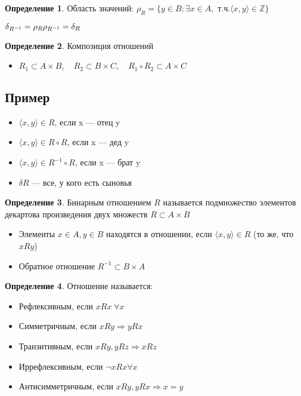 \documentclass[12pt,letterpaper]{report}
\theoremstyle{definition}
\newtheorem*{conj}{Определение}
\begin{document}
\begin{conj} 
    Область значений: 
    $\rho_{R} = \{y \in B: \exists x \in A, $ т.ч.$ \langle x, y \rangle  \in \mathbb{Z} \} $ 
\end{conj}
$\delta_{R^{-1}} = \rho_{R} \\
\rho_{R^{-1}} = \delta_{R}$

\begin{conj} 
    Композиция отношений 
\end{conj}

\begin{itemize}
    \item[] $R_1 \subset A \times B, \quad R_2 \subset B \times C, \quad R_1 \circ R_2 \subset A \times C$
\end{itemize}
\subsection*{Пример}
\begin{itemize}
    \item $\langle x, y \rangle \in R$, если x — отец y
    \item $\langle x, y \rangle \in R \circ R$, если x — дед y
    \item $\langle x, y \rangle \in R^{-1} \circ R$, если x — брат y
    \item $\delta R$ — все, у кого есть сыновья
\end{itemize}
\begin{conj} 
    Бинарным отношением $R$ называется подмножество элементов декартова произведения двух
    множеств $R \subset A \times B$
\end{conj}

\begin{itemize}
    \item[] Элементы $x \in A, y \in B$ находятся в отношении, если $  \langle x, y \rangle \in R $ (то же, что $xRy$)
    \item[] Обратное отношение $R^{-1} \subset B \times A$ 
\end{itemize}

\begin{conj}
    Отношение называется:
\end{conj}
\begin{itemize}
    \item Рефлексивным, если $xRx \; \forall x$
    \item Симметричным, если $xRy \Longrightarrow yRx$
    \item Транзитивным, если $xRy, yRz \Longrightarrow xRz$
    \item Иррефлексивным, если $\neg xRx \forall x$
    \item Антисимметричным, если $xRy, yRx \Longrightarrow x = y$
\end{itemize}
\end{document}
